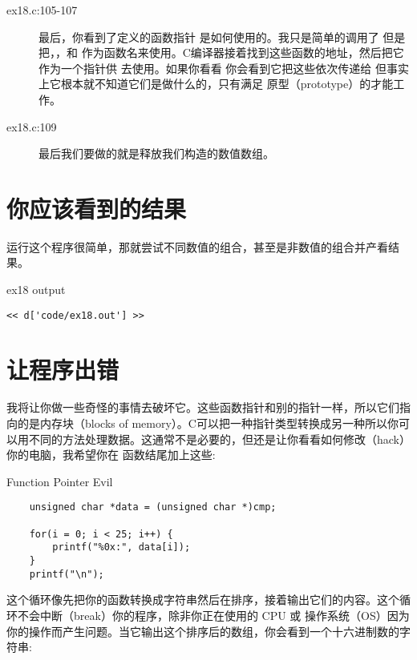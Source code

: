 \begin{description}
\item[ex18.c:105-107] 最后，你看到了定义的函数指针 是如何使用的。我只是简单的调用了  但是把，，和
    作为函数名来使用。C编译器接着找到这些函数的地址，然后把它作为一个指针供  去使用。如果你看看 你会看到它把这些依次传递给 但事实上它根本就不知道它们是做什么的，只有满足 原型（prototype）的才能工作。
\item[ex18.c:109] 最后我们要做的就是释放我们构造的数值数组。
\end{description}


\section{你应该看到的结果}

运行这个程序很简单，那就尝试不同数值的组合，甚至是非数值的组合并产看结果。

\begin{code}{ex18 output}
\begin{lstlisting}
<< d['code/ex18.out'] >>
\end{lstlisting}
\end{code}


\section{让程序出错}

我将让你做一些奇怪的事情去破坏它。这些函数指针和别的指针一样，所以它们指向的是内存块（blocks of memory）。C可以把一种指针类型转换成另一种所以你可以用不同的方法处理数据。这通常不是必要的，但还是让你看看如何修改（hack）你的电脑，我希望你在  函数结尾加上这些:

\begin{code}{Function Pointer Evil}
\begin{lstlisting}
    unsigned char *data = (unsigned char *)cmp;

    for(i = 0; i < 25; i++) {
        printf("%0x:", data[i]);
    }
    printf("\n");
\end{lstlisting}
\end{code}

这个循环像先把你的函数转换成字符串然后在排序，接着输出它们的内容。这个循环不会中断（break）你的程序，除非你正在使用的 CPU 或 操作系统（OS）因为你的操作而产生问题。当它输出这个排序后的数组，你会看到一个十六进制数的字符串:


